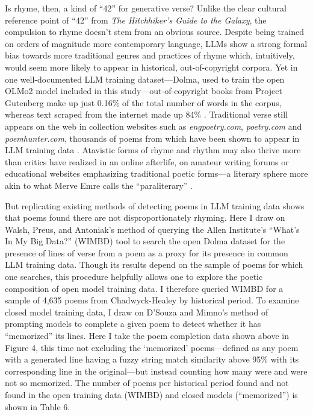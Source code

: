 \documentclass{simple-humanities}         %
\begin{document}
Is rhyme, then, a kind of ``42'' for generative verse?
Unlike the clear cultural reference point of ``42'' from \emph{The Hitchhiker's Guide to the Galaxy}, the compulsion to rhyme doesn't stem from an obvious source.
Despite being trained on orders of magnitude more contemporary language, LLMs show a strong formal bias towards more traditional genres and practices of rhyme which, intuitively, would seem more likely to appear in historical, out-of-copyright corpora. 
Yet in one well-documented LLM training dataset---Dolma, used to train the open OLMo2 model included in this study---out-of-copyright books from Project Gutenberg make up just 0.16\% of the total number of words in the corpus, whereas text scraped from the internet made up 84\% \parencite{soldainiDolmaOpenCorpus2024}. 
Traditional verse still appears on the web in collection websites such as \emph{engpoetry.com}, \emph{poetry.com} and \emph{poemhunter.com}, thousands of poems from which have been shown to appear in LLM training data \parencite{walshSonnetNotBot2024}. 
Atavistic forms of rhyme and rhythm may also thrive more than critics have realized in an online afterlife, on amateur writing forums or educational websites emphasizing traditional poetic forms---a literary sphere more akin to what Merve Emre calls the ``paraliterary'' \parencite{emreParaliteraryMakingBad2017a}.

But replicating existing methods of detecting poems in LLM training data shows that poems found there are not disproportionately rhyming.  
Here I draw on Walsh, Preus, and Antoniak's method of querying the Allen Institute's ``What's In My Big Data?'' (WIMBD) tool to search the open Dolma dataset for the presence of lines of verse from a poem as a proxy for its presence in common LLM training data.
Though its results depend on the sample of poems for which one searches, this procedure helpfully allows one to explore the poetic composition of open model training data.
I therefore queried WIMBD for a sample of 4,635 poems from Chadwyck-Healey by historical period.
To examine closed model training data, I draw on D'Souza and Mimno's method of prompting models to complete a given poem to detect whether it has ``memorized'' its lines.
Here I take the poem completion data shown above in Figure 4, this time not excluding the `memorized' poems---defined as any poem with a generated line having a fuzzy string match similarity above 95\% with its corresponding line in the original---but instead counting how many were and were not so memorized.
The number of poems per historical period found and not found in the open training data (WIMBD) and closed models (``memorized'') is shown in Table 6. 
\end{document}
